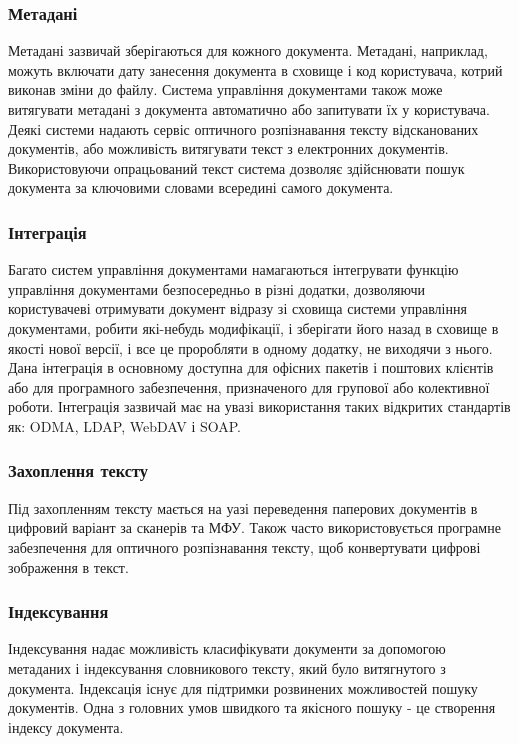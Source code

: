 \subsubsection{Метадані}
Метадані зазвичай зберігаються для кожного документа. 
Метадані, наприклад, можуть включати дату занесення документа в сховище і код користувача, котрий виконав зміни до файлу. 
Система управління документами також може витягувати метадані з документа автоматично або запитувати їх у користувача. 
Деякі системи надають сервіс оптичного розпізнавання тексту відсканованих документів, або можливість витягувати текст з електронних документів. 
Використовуючи опрацьований текст система дозволяє здійснювати пошук документа за ключовими словами всередині самого документа.

\subsubsection{Інтеграція }
Багато систем управління документами намагаються інтегрувати функцію управління документами безпосередньо в різні додатки, дозволяючи користувачеві отримувати документ відразу зі сховища системи управління документами, робити які-небудь модифікації, і зберігати його назад в сховище в якості нової версії, і все це проробляти в одному додатку, не виходячи з нього. 
Дана інтеграція в основному доступна для офісних пакетів і поштових клієнтів або для програмного забезпечення, призначеного для групової або колективної роботи. 
Інтеграція зазвичай має на увазі використання таких відкритих стандартів як: ODMA, LDAP, WebDAV і SOAP.

\subsubsection{Захоплення тексту}
Під захопленням тексту мається на уазі переведення паперових документів в цифровий варіант за сканерів та МФУ.
Також часто використовується програмне забезпечення для оптичного розпізнавання тексту, щоб конвертувати цифрові зображення в текст.

\subsubsection{Індексування}
Індексування надає можливість класифікувати документи за допомогою метаданих і індексування словникового тексту, який було витягнутого з документа.
Індексація існує для підтримки розвинених можливостей пошуку документів. 
Одна з головних умов швидкого та якісного пошуку - це створення індексу документа.

